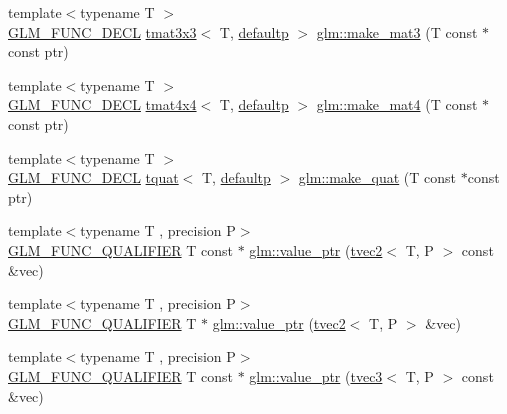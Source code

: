 \begin{DoxyCompactItemize}
\item 
{\footnotesize template$<$typename T $>$ }\\\mbox{\hyperlink{setup_8hpp_ab2d052de21a70539923e9bcbf6e83a51}{G\+L\+M\+\_\+\+F\+U\+N\+C\+\_\+\+D\+E\+CL}} \mbox{\hyperlink{structglm_1_1tmat3x3}{tmat3x3}}$<$ T, \mbox{\hyperlink{namespaceglm_a0f04f086094c747d227af4425893f545a9d21ccd8b5a009ec7eb7677befc3bf51}{defaultp}} $>$ \mbox{\hyperlink{group__gtc__type__ptr_gac2bc10c519ffc8db9e24f325f23787ea}{glm\+::make\+\_\+mat3}} (T const $\ast$const ptr)
\item 
{\footnotesize template$<$typename T $>$ }\\\mbox{\hyperlink{setup_8hpp_ab2d052de21a70539923e9bcbf6e83a51}{G\+L\+M\+\_\+\+F\+U\+N\+C\+\_\+\+D\+E\+CL}} \mbox{\hyperlink{structglm_1_1tmat4x4}{tmat4x4}}$<$ T, \mbox{\hyperlink{namespaceglm_a0f04f086094c747d227af4425893f545a9d21ccd8b5a009ec7eb7677befc3bf51}{defaultp}} $>$ \mbox{\hyperlink{group__gtc__type__ptr_ga2c6e6d457cb932e1ce683e4f690a6f60}{glm\+::make\+\_\+mat4}} (T const $\ast$const ptr)
\item 
{\footnotesize template$<$typename T $>$ }\\\mbox{\hyperlink{setup_8hpp_ab2d052de21a70539923e9bcbf6e83a51}{G\+L\+M\+\_\+\+F\+U\+N\+C\+\_\+\+D\+E\+CL}} \mbox{\hyperlink{structglm_1_1tquat}{tquat}}$<$ T, \mbox{\hyperlink{namespaceglm_a0f04f086094c747d227af4425893f545a9d21ccd8b5a009ec7eb7677befc3bf51}{defaultp}} $>$ \mbox{\hyperlink{group__gtc__type__ptr_gaadafb6600af2633e4c98cc64c72f5269}{glm\+::make\+\_\+quat}} (T const $\ast$const ptr)
\item 
{\footnotesize template$<$typename T , precision P$>$ }\\\mbox{\hyperlink{setup_8hpp_a33fdea6f91c5f834105f7415e2a64407}{G\+L\+M\+\_\+\+F\+U\+N\+C\+\_\+\+Q\+U\+A\+L\+I\+F\+I\+ER}} T const  $\ast$ \mbox{\hyperlink{group__gtc__type__ptr_gafb01331238d8899dde700cb9b5dc6ef3}{glm\+::value\+\_\+ptr}} (\mbox{\hyperlink{structglm_1_1tvec2}{tvec2}}$<$ T, P $>$ const \&vec)
\item 
{\footnotesize template$<$typename T , precision P$>$ }\\\mbox{\hyperlink{setup_8hpp_a33fdea6f91c5f834105f7415e2a64407}{G\+L\+M\+\_\+\+F\+U\+N\+C\+\_\+\+Q\+U\+A\+L\+I\+F\+I\+ER}} T $\ast$ \mbox{\hyperlink{group__gtc__type__ptr_gabd3cc713184a2093862605f5f0abb8a4}{glm\+::value\+\_\+ptr}} (\mbox{\hyperlink{structglm_1_1tvec2}{tvec2}}$<$ T, P $>$ \&vec)
\item 
{\footnotesize template$<$typename T , precision P$>$ }\\\mbox{\hyperlink{setup_8hpp_a33fdea6f91c5f834105f7415e2a64407}{G\+L\+M\+\_\+\+F\+U\+N\+C\+\_\+\+Q\+U\+A\+L\+I\+F\+I\+ER}} T const  $\ast$ \mbox{\hyperlink{group__gtc__type__ptr_gac04db5d9c05bd3d50140f34f8695a08c}{glm\+::value\+\_\+ptr}} (\mbox{\hyperlink{structglm_1_1tvec3}{tvec3}}$<$ T, P $>$ const \&vec)

\end{DoxyCompactItemize}
